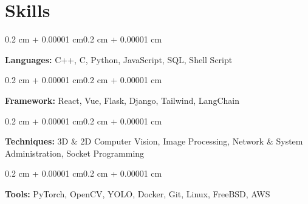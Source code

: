 \documentclass[10pt, letterpaper]{article}
\newenvironment{highlights}{
    \begin{itemize}[
        topsep=0.05 cm,
        parsep=0.05 cm,
        partopsep=0pt,
        itemsep=0pt,
        leftmargin=0.4 cm + 10pt
    ]
}{
    \end{itemize}
}
\newenvironment{onecolentry}{
    \begin{adjustwidth}{0.2 cm + 0.00001 cm}{0.2 cm + 0.00001 cm}
}{
    \end{adjustwidth}
}
\newenvironment{twocolentry}[2][]{
    \onecolentry
    \def\secondColumn{#2}
    \setcolumnwidth{\fill, 4.5 cm}
    \begin{paracol}{2}
}{
    \switchcolumn \raggedleft \secondColumn
    \end{paracol}
    \endonecolentry
}
\let\hrefWithoutArrow\href
\renewcommand{\href}[2]{\hrefWithoutArrow{#1}{\ifthenelse{\equal{#2}{}}{ }{#2 }\raisebox{.15ex}{\footnotesize \faExternalLink*}}}
\begin{document}



    \section{Skills}
        \begin{onecolentry}
            \textbf{Languages:} C++, C, Python, JavaScript, SQL, Shell Script
        \end{onecolentry}
        
        \vspace{0.15 cm}
        \begin{onecolentry}
            \textbf{Framework:} React, Vue, Flask, Django, Tailwind, LangChain
        \end{onecolentry}
        
        \vspace{0.15 cm}
        \begin{onecolentry}
            \textbf{Techniques:} 3D \& 2D Computer Vision, Image Processing, Network \& System Administration, Socket Programming
        \end{onecolentry}

        \vspace{0.15 cm}
        \begin{onecolentry}
            \textbf{Tools:} PyTorch, OpenCV, YOLO, Docker, Git, Linux, FreeBSD, AWS
        \end{onecolentry}
\end{document}
